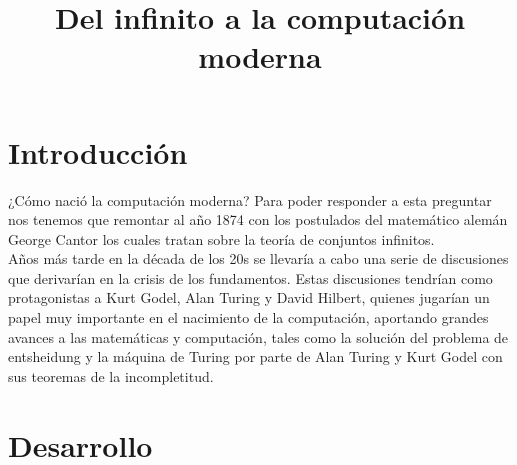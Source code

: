 \documentclass[conference,compsoc]{IEEEtran}
\begin{document}
\title{Del infinito a la computación moderna}


\author{
}
\maketitle





%
\IEEEpeerreviewmaketitle



\section{Introducción}
¿Cómo nació la computación moderna? Para poder responder a esta preguntar nos tenemos que remontar al año 1874 con los postulados del matemático  alemán George Cantor los cuales tratan  sobre la teoría de conjuntos infinitos. \\
Años más tarde en la década de los 20s se llevaría a cabo una serie de discusiones que derivarían en la crisis de los fundamentos. Estas discusiones tendrían como protagonistas a Kurt Godel, Alan Turing y David Hilbert, quienes jugarían un papel muy importante en el nacimiento de la computación, aportando grandes avances a las matemáticas y computación, tales como la solución  del problema de entsheidung y la máquina de Turing por parte de Alan  Turing y Kurt Godel con sus teoremas de la incompletitud.


\section{Desarrollo}
\end{document}
